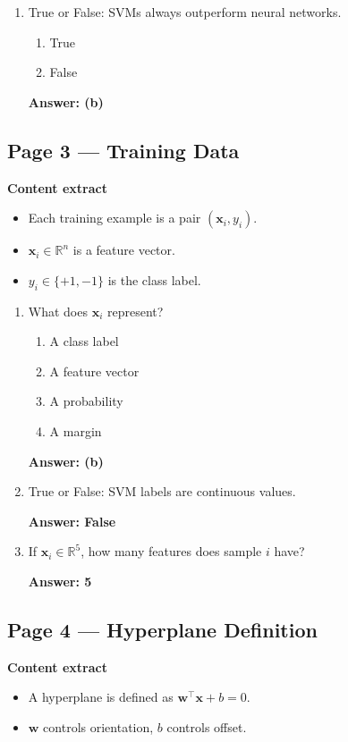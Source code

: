 \documentclass[12pt]{article}
\begin{document}
\begin{enumerate}
	\item True or False: SVMs always outperform neural networks.
	\begin{enumerate}
		\item True
		\item False
	\end{enumerate}
	\textbf{Answer: (b)}
\end{enumerate}

\subsection*{Page 3 — Training Data}

\textbf{Content extract}
\begin{itemize}
	\item Each training example is a pair $(\mathbf{x}_i, y_i)$.
	\item $\mathbf{x}_i \in \mathbb{R}^n$ is a feature vector.
	\item $y_i \in \{+1, -1\}$ is the class label.
\end{itemize}

\begin{enumerate}
	\item What does $\mathbf{x}_i$ represent?
	\begin{enumerate}
		\item A class label
		\item A feature vector
		\item A probability
		\item A margin
	\end{enumerate}
	\textbf{Answer: (b)}
	
	\item True or False: SVM labels are continuous values.
	
	\textbf{Answer: False}
	
	\item If $\mathbf{x}_i \in \mathbb{R}^5$, how many features does sample $i$ have?
	
	\textbf{Answer: 5}
\end{enumerate}


\subsection*{Page 4 — Hyperplane Definition}

\textbf{Content extract}
\begin{itemize}
	\item A hyperplane is defined as $\mathbf{w}^\top \mathbf{x} + b = 0$.
	\item $\mathbf{w}$ controls orientation, $b$ controls offset.
\end{itemize}
\end{document}
